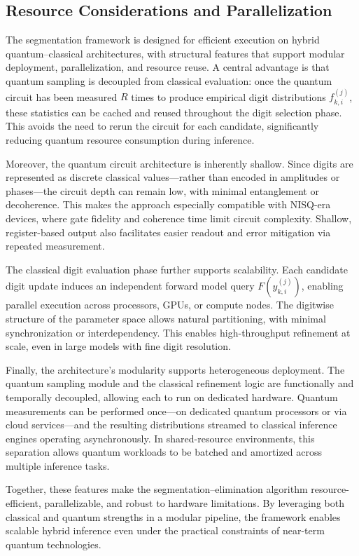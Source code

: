 \documentclass[aps,twocolumn,superscriptaddress,nofootinbib]{revtex4}
\begin{document}
\subsection{Resource Considerations and Parallelization}
The segmentation framework is designed for efficient execution on hybrid quantum--classical architectures, with structural features that support modular deployment, parallelization, and resource reuse. A central advantage is that quantum sampling is decoupled from classical evaluation: once the quantum circuit has been measured \( R \) times to produce empirical digit distributions \( f^{(j)}_{k,i} \), these statistics can be cached and reused throughout the digit selection phase. This avoids the need to rerun the circuit for each candidate, significantly reducing quantum resource consumption during inference.

Moreover, the quantum circuit architecture is inherently shallow. Since digits are represented as discrete classical values—rather than encoded in amplitudes or phases—the circuit depth can remain low, with minimal entanglement or decoherence. This makes the approach especially compatible with NISQ-era devices, where gate fidelity and coherence time limit circuit complexity. Shallow, register-based output also facilitates easier readout and error mitigation via repeated measurement.

The classical digit evaluation phase further supports scalability. Each candidate digit update induces an independent forward model query \( F(y^{(j)}_{k,i}) \), enabling parallel execution across processors, GPUs, or compute nodes. The digitwise structure of the parameter space allows natural partitioning, with minimal synchronization or interdependency. This enables high-throughput refinement at scale, even in large models with fine digit resolution.

Finally, the architecture’s modularity supports heterogeneous deployment. The quantum sampling module and the classical refinement logic are functionally and temporally decoupled, allowing each to run on dedicated hardware. Quantum measurements can be performed once—on dedicated quantum processors or via cloud services—and the resulting distributions streamed to classical inference engines operating asynchronously. In shared-resource environments, this separation allows quantum workloads to be batched and amortized across multiple inference tasks.

Together, these features make the segmentation--elimination algorithm resource-efficient, parallelizable, and robust to hardware limitations. By leveraging both classical and quantum strengths in a modular pipeline, the framework enables scalable hybrid inference even under the practical constraints of near-term quantum technologies.
\end{document}
